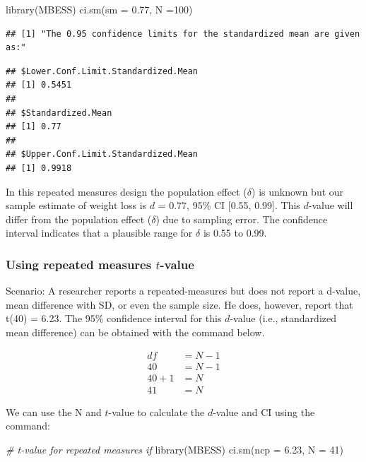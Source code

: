 \documentclass[
]{krantz}
\makeatletter
\newenvironment{Shaded}{\begin{snugshade}}{\end{snugshade}}
\newcommand{\AttributeTok}[1]{\textcolor[rgb]{0.61,0.61,0.61}{#1}}
\newcommand{\CommentTok}[1]{\textcolor[rgb]{0.37,0.37,0.37}{\textit{#1}}}
\newcommand{\DecValTok}[1]{\textcolor[rgb]{0.06,0.06,0.06}{#1}}
\newcommand{\FloatTok}[1]{\textcolor[rgb]{0.06,0.06,0.06}{#1}}
\newcommand{\FunctionTok}[1]{\textcolor[rgb]{0,0,0}{#1}}
\newcommand{\NormalTok}[1]{#1}
\newenvironment{kframe}{%
\medskip{}
\setlength{\fboxsep}{.8em}
 \def\at@end@of@kframe{}%
 \ifinner\ifhmode%
  \def\at@end@of@kframe{\end{minipage}}%
  \begin{minipage}{\columnwidth}%
 \fi\fi%
 \def\FrameCommand##1{\hskip\@totalleftmargin \hskip-\fboxsep
 \colorbox{shadecolor}{##1}\hskip-\fboxsep
     \hskip-\linewidth \hskip-\@totalleftmargin \hskip\columnwidth}%
 \MakeFramed {\advance\hsize-\width
   \@totalleftmargin\z@ \linewidth\hsize
   \@setminipage}}%
 {\par\unskip\endMakeFramed%
 \at@end@of@kframe}
\renewenvironment{Shaded}{\begin{kframe}}{\end{kframe}}
\makeatother
\begin{document}
\begin{Shaded}
\begin{Highlighting}[]
\FunctionTok{library}\NormalTok{(MBESS)}
\FunctionTok{ci.sm}\NormalTok{(}\AttributeTok{sm =} \FloatTok{0.77}\NormalTok{, }\AttributeTok{N =}\DecValTok{100}\NormalTok{) }
\end{Highlighting}
\end{Shaded}

\begin{verbatim}
## [1] "The 0.95 confidence limits for the standardized mean are given as:"
\end{verbatim}

\begin{verbatim}
## $Lower.Conf.Limit.Standardized.Mean
## [1] 0.5451
## 
## $Standardized.Mean
## [1] 0.77
## 
## $Upper.Conf.Limit.Standardized.Mean
## [1] 0.9918
\end{verbatim}

In this repeated measures design the population effect (\(\delta\)) is unknown but our sample estimate of weight loss is \(d\) = 0.77, 95\% CI {[}0.55, 0.99{]}. This \(d\)-value will differ from the population effect (\(\delta\)) due to sampling error. The confidence interval indicates that a plausible range for \(\delta\) is 0.55 to 0.99.

\hypertarget{using-repeated-measures-t-value}{%
\subsubsection{\texorpdfstring{Using repeated measures \(t\)-value}{Using repeated measures t-value}}\label{using-repeated-measures-t-value}}

Scenario: A researcher reports a repeated-measures but does not report a d-value, mean difference with SD, or even the sample size. He does, however, report that t(40) = 6.23. The 95\% confidence interval for this \(d\)-value (i.e., standardized mean difference) can be obtained with the command below.

\[
\begin{aligned}
df &= N - 1 \\
40 &= N - 1\\
40 + 1 &= N\\
41 &= N
\end{aligned}
\]

We can use the N and \(t\)-value to calculate the \(d\)-value and CI using the command:

\begin{Shaded}
\begin{Highlighting}[]
\CommentTok{\# t{-}value for repeated measures if }
\FunctionTok{library}\NormalTok{(MBESS)}
\FunctionTok{ci.sm}\NormalTok{(}\AttributeTok{ncp =} \FloatTok{6.23}\NormalTok{, }\AttributeTok{N =} \DecValTok{41}\NormalTok{)}
\end{Highlighting}
\end{Shaded}
\end{document}
